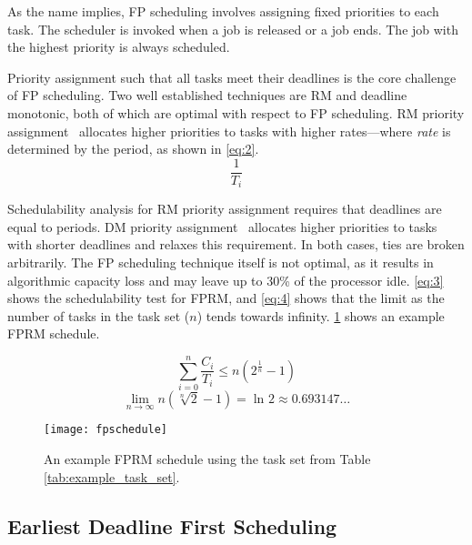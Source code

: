 As the name implies, \gls{FP} scheduling involves assigning fixed priorities to each task.
The scheduler is invoked when a job is released or a job ends.
The job with the highest priority is always scheduled.

Priority assignment such that all tasks meet their deadlines is the core challenge of \gls{FP} scheduling.
Two well established techniques are \gls{RM} and deadline monotonic, both of which are optimal with respect to \gls{FP} scheduling.
\Gls{RM} priority assignment~\citep{Liu_Layland_73} allocates higher priorities to tasks with higher
rates---where \emph{rate} is determined by the period, as shown in \cref{eq:2}.
\begin{equation}
    \label{eq:2}
	\dfrac{1}{T_{i}}
\end{equation}

Schedulability analysis for \gls{RM} priority assignment requires that deadlines are equal to periods.
\Gls{DM} priority assignment~\citep{Leung_Whitehead_82} allocates higher priorities to tasks with shorter deadlines and relaxes this requirement.
In both cases, ties are broken arbitrarily.
The \gls{FP} scheduling technique itself is not optimal, as it results in algorithmic capacity loss
and may leave up to 30\% of the processor idle. \cref{eq:3} shows the schedulability test for
\gls{FPRM}, and \cref{eq:4} shows that the limit as the number of tasks in the task set ($n$) tends
towards infinity.
\cref{f:fp-schedule} shows an example \gls{FPRM} schedule.

\begin{equation}
    \label{eq:3}
    \sum\limits_{i=0}^n \dfrac{C_{i}}{T_{i}} \leq n(2^{\frac{1}{n}}-1)
\end{equation}
\begin{equation}
    \label{eq:4}
    \lim_{n \to \infty}n(\sqrt[n]{2}-1) = \ln_{} 2 \approx 0.693147\ldots
\end{equation}

\begin{figure}
	\begin{center}
		\leavevmode
		\texttt{[image: fpschedule]}
		\caption{An example FPRM schedule using the task set from Table \ref{tab:example_task_set}.}
		\label{f:fp-schedule}
	\end{center}
\end{figure}

\subsection{Earliest Deadline First Scheduling}

